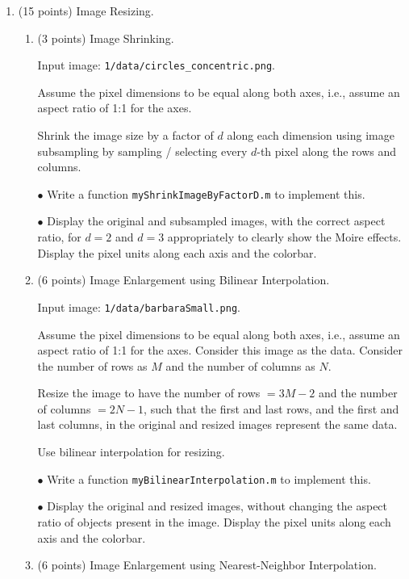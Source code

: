 \documentclass[11pt]{article}
\begin{document}
\begin {enumerate}
  
\item (15 points) Image Resizing.
  
  \begin {enumerate} 
  \item (3 points) Image Shrinking.
    
    Input image: \texttt{1/data/circles\_concentric.png}.
    
    Assume the pixel dimensions to be equal
    along both axes, i.e., assume an aspect ratio of 1:1 for the axes.
    
    Shrink the image size by a factor of $d$ along each dimension using image subsampling by sampling / selecting every $d$-th pixel along the rows and columns.
    
    $\bullet$ Write a function \texttt{myShrinkImageByFactorD.m} to implement this.
    
    $\bullet$ Display the original and subsampled images, with the correct aspect ratio, for $d = 2$ and $d = 3$ appropriately to clearly show the
    Moire effects. Display the pixel units along each axis and the colorbar.
    
  \item (6 points) Image Enlargement using Bilinear Interpolation.
    
    Input image: \texttt{1/data/barbaraSmall.png}.
    
    Assume the pixel dimensions to be equal along both axes, i.e., assume an aspect ratio of 1:1 for the axes. Consider this image as the
    data. Consider the number of rows as $M$ and the number of columns as $N$.
    
    Resize the image to have the number of rows $= 3 M - 2$ and the number of columns $= 2 N - 1$, such that the first and last rows, and the first
    and last columns, in the original and resized images represent the same data.
    
    Use bilinear interpolation for resizing.
    
    $\bullet$ Write a function \texttt{myBilinearInterpolation.m} to implement this.
    
    $\bullet$ Display the original and resized images, without changing the aspect ratio of objects present in the image. Display the pixel units along
    each axis and the colorbar.
    
  \item (6 points) Image Enlargement using Nearest-Neighbor Interpolation.
    

\end{enumerate}
\end{enumerate}
\end{document}
